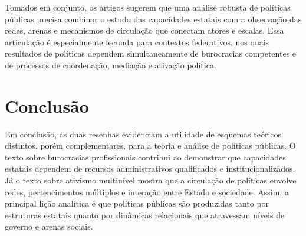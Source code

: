\documentclass[12pt,a4paper]{article}
\begin{document}
Tomados em conjunto, os artigos sugerem que uma análise robusta de políticas públicas precisa combinar o estudo das capacidades estatais com a observação das redes, arenas e mecanismos de circulação que conectam atores e escalas. Essa articulação é especialmente fecunda para contextos federativos, nos quais resultados de políticas dependem simultaneamente de burocracias competentes e de processos de coordenação, mediação e ativação política.



\section{Conclusão}
\label{sec:org6cdf320}

Em conclusão, as duas resenhas evidenciam a utilidade de esquemas teóricos distintos, porém complementares, para a teoria e análise de políticas públicas. O texto sobre burocracias profissionais contribui ao demonstrar que capacidades estatais dependem de recursos administrativos qualificados e institucionalizados. Já o texto sobre ativismo multinível mostra que a circulação de políticas envolve redes, pertencimentos múltiplos e interação entre Estado e sociedade. Assim, a principal lição analítica é que políticas públicas são produzidas tanto por estruturas estatais quanto por dinâmicas relacionais que atravessam níveis de governo e arenas sociais.

\printbibliography
\end{document}
